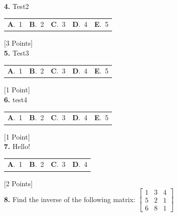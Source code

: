 \documentclass[12pt]{article}
\newcommand{\choice}[2]{\textbf{#1}.~#2}
\begin{document}
\noindent \textbf{\textenglish{4.}} {\textenglish{Test2}}

\begin{tabularx}{\linewidth}{@{}*{5}{Y}@{}}
\choice{A}{{{\textenglish{1}}}} & \choice{B}{{{\textenglish{2}}}} & \choice{C}{{{\textenglish{3}}}} & \choice{D}{{{\textenglish{4}}}} & \choice{E}{{{\textenglish{5}}}} \\
\end{tabularx}
\hfill {\textenglish{[3 Points]}}\\[0.5em]

\noindent \textbf{\textenglish{5.}} {\textenglish{Test3}}

\begin{tabularx}{\linewidth}{@{}*{5}{Y}@{}}
\choice{A}{{{\textenglish{1}}}} & \choice{B}{{{\textenglish{2}}}} & \choice{C}{{{\textenglish{3}}}} & \choice{D}{{{\textenglish{4}}}} & \choice{E}{{{\textenglish{5}}}} \\
\end{tabularx}
\hfill {\textenglish{[1 Point]}}\\[0.5em]

\noindent \textbf{\textenglish{6.}} {\textenglish{test4}}

\begin{tabularx}{\linewidth}{@{}*{5}{Y}@{}}
\choice{A}{{{\textenglish{1}}}} & \choice{B}{{{\textenglish{2}}}} & \choice{C}{{{\textenglish{3}}}} & \choice{D}{{{\textenglish{4}}}} & \choice{E}{{{\textenglish{5}}}} \\
\end{tabularx}
\hfill {\textenglish{[1 Point]}}\\[0.5em]

\noindent \textbf{\textenglish{7.}} {\textenglish{Hello!}}

\begin{tabularx}{\linewidth}{@{}*{4}{Y}@{}}
\choice{A}{{{\textenglish{1}}}} & \choice{B}{{{\textenglish{2}}}} & \choice{C}{{{\textenglish{3}}}} & \choice{D}{{{\textenglish{4}}}} \\
\end{tabularx}
\hfill {\textenglish{[2 Points]}}\\[0.5em]

\noindent \textbf{\textenglish{8.}} {\textenglish{Find the inverse of the following matrix: }}\(\begin{bmatrix} 1 & 3 & 4 \\ 5 & 2 & 1 \\ 6 & 8 & 1 \end{bmatrix}\)
\end{document}
